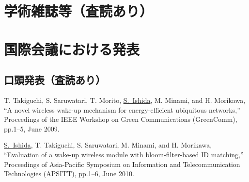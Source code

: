 \publications


\def\mej{\underline{石田繁巳}}
\def\me{\underline{S.~Ishida}}

\section*{学術雑誌等（査読あり）}


\section*{国際会議における発表}
\subsection*{口頭発表（査読あり）}
\begin{publication}{99}
  T. Takiguchi, S. Saruwatari, T. Morito, \me, M. Minami, and H. Morikawa,
  ``A novel wireless wake-up mechanism for energy-efficient ubiquitous
  networks,''
  Proceedings of the {IEEE} Workshop on Green Communications (GreenComm),
  pp.1--5, June 2009.

  \me, T. Takiguchi, S. Saruwatari, M. Minami, and H. Morikawa,
  ``Evaluation of a wake-up wireless module with bloom-filter-based {ID}
  matching,''
  Proceedings of Asia-Pacific Symposium on Information and Telecommunication
  Technologies (APSITT),
  pp.1--6, June 2010.

\end{publication}

